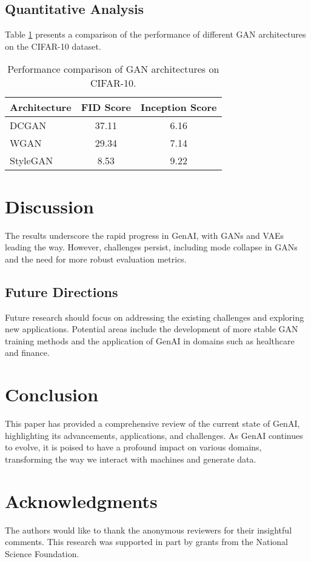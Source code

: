 \documentclass[12pt,a4paper]{article}
\begin{document}
\subsection{Quantitative Analysis}
Table \ref{tab:gan_performance} presents a comparison of the performance of different GAN architectures on the CIFAR-10 dataset.

\begin{table}[h]
\centering
\begin{tabular}{lcc}
\hline
Architecture & FID Score & Inception Score \\
\hline
DCGAN & 37.11 & 6.16 \\
WGAN & 29.34 & 7.14 \\
StyleGAN & 8.53 & 9.22 \\
\hline
\end{tabular}
\caption{Performance comparison of GAN architectures on CIFAR-10.}
\label{tab:gan_performance}
\end{table}

\section{Discussion}
The results underscore the rapid progress in GenAI, with GANs and VAEs leading the way. However, challenges persist, including mode collapse in GANs and the need for more robust evaluation metrics.

\subsection{Future Directions}
Future research should focus on addressing the existing challenges and exploring new applications. Potential areas include the development of more stable GAN training methods and the application of GenAI in domains such as healthcare and finance.

\section{Conclusion}
This paper has provided a comprehensive review of the current state of GenAI, highlighting its advancements, applications, and challenges. As GenAI continues to evolve, it is poised to have a profound impact on various domains, transforming the way we interact with machines and generate data.

\section*{Acknowledgments}
The authors would like to thank the anonymous reviewers for their insightful comments. This research was supported in part by grants from the National Science Foundation.
\end{document}
